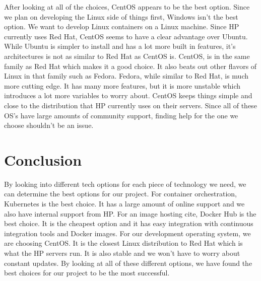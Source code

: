 \documentclass[onecolumn, draftclsnofoot,10pt, compsoc]{IEEEtran}
\begin{document}
After looking at all of the choices, CentOS appears to be the best option. Since we plan on developing the Linux side of things first, Windows isn't the best option. We want to develop Linux containers on a Linux machine. Since HP currently uses Red Hat, CentOS seems to have a clear advantage over Ubuntu. While Ubuntu is simpler to install and has a lot more built in features, it’s architectures is not as similar to Red Hat as CentOS is. CentOS, is in the same family as Red Hat which makes it a good choice. It also beats out other flavors of Linux in that family such as Fedora. Fedora, while similar to Red Hat, is much more cutting edge. It has many more features, but it is more unstable which introduces a lot more variables to worry about. CentOS keeps things simple and close to the distribution that HP currently uses on their servers. Since all of these OS's have large amounts of community support, finding help for the one we choose shouldn't be an issue.

\section{Conclusion}
By looking into different tech options for each piece of technology we need, we can determine the best options for our project. For container orchestration, Kubernetes is the best choice. It has a large amount of online support and we also have internal support from HP. For an image hosting cite, Docker Hub is the best choice. It is the cheapest option and it has easy integration with continuous integration tools and Docker images. For our development operating system, we are choosing CentOS. It is the closest Linux distribution to Red Hat which is what the HP servers run. It is also stable and we won't have to worry about constant updates. By looking at all of these different options, we have found the best choices for our project to be the most successful. 





\end{document}

